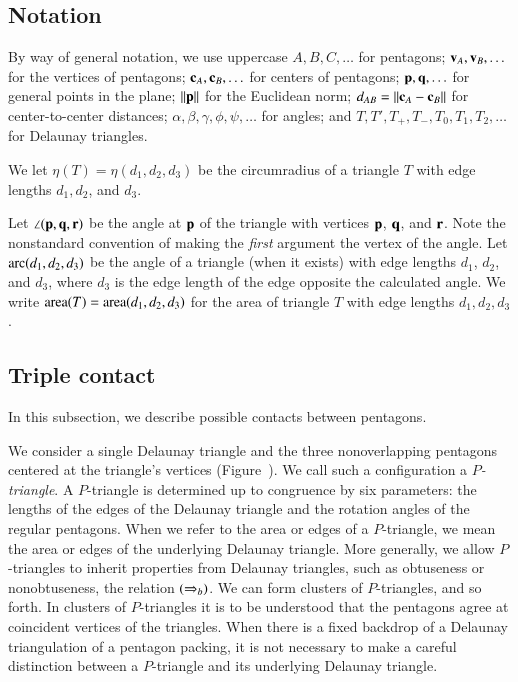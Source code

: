 \subsection{Notation}

By way of general notation, we use uppercase $A,B,C,\ldots$ for
pentagons; ${\mathbf v}_A,{\mathbf v}_B,\ldots$ for the vertices of pentagons;
${\mathbf c}_A,{\mathbf c}_B,\ldots$ for centers of pentagons; ${\mathbf p},{\mathbf q},\ldots$ for
general points in the plane; ${\|{\mathbf p}\|}$ for the Euclidean norm;
$\dx{AB}=\dd{A}{B}$ for center-to-center distances;
$\alpha,\beta,\gamma,\phi,\psi,\ldots$ for angles; and
$T,T',T_+,T_-,T_0,T_1,T_2,\ldots$ for Delaunay triangles.

We let $\eta(T) = \eta(d_1,d_2,d_3)$ be the circumradius of a triangle
$T$ with edge lengths $d_1,d_2$, and $d_3$.

Let $\angle({\mathbf p},{\mathbf q},{\mathbf r})$ be the angle at ${\mathbf p}$ of the triangle with
vertices ${\mathbf p}$, ${\mathbf q}$, and ${\mathbf r}$.  Note the nonstandard convention of
making the \emph{first} argument the vertex of the angle.  Let $\operatorname{arc}(d_1,d_2,d_3)$ be the angle
of a triangle (when it exists) with edge lengths $d_1$, $d_2$, and
$d_3$, where $d_3$ is the edge length of the edge opposite the
calculated angle.  We write ${\operatorname{area}}(T)= {\operatorname{area}}(d_1,d_2,d_3)$ for the
area of triangle $T$ with edge lengths $d_1,d_2,d_3$.

\subsection{Triple contact}

In this subsection, we describe possible contacts between pentagons.

We consider a single Delaunay triangle and the three nonoverlapping
pentagons centered at the triangle's vertices
(Figure~).  We call such a configuration a {\it
  $P$-triangle}.  A $P$-triangle is determined up to congruence by six
parameters: the lengths of the edges of the Delaunay triangle and the
rotation angles of the regular pentagons.  When we refer to the area
or edges of a $P$-triangle, we mean the area or edges of the
underlying Delaunay triangle.  More generally, we allow $P$-triangles
to inherit properties from Delaunay triangles, such as obtuseness or
nonobtuseness, the relation $(\Rightarrow_{b})$. We can form clusters of $P$-triangles, and so forth. In
clusters of $P$-triangles it is to be understood that the pentagons
agree at coincident vertices of the triangles.  When there is a
fixed backdrop of a Delaunay triangulation of a pentagon packing, it
is not necessary to make a careful distinction between a $P$-triangle
and its underlying Delaunay triangle.

